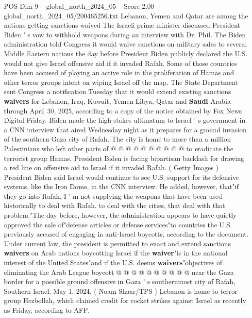 \begin{textsample}{POS Dim 9 – global\_north\_2024\_05 – Score 2.00 – global\_north\_2024\_05/200465256.txt}  \label{ex:f9_pos_207}
Lebanon, Yemen and Qatar are among the nations getting sanctions waived The Israeli prime minister discussed President Biden ' s vow to withhold weapons during an interview with Dr.
Phil.
The Biden administration told Congress it would waive sanctions on military sales to several Middle Eastern nations the day before President Biden publicly declared the U.S. would not give Israel offensive aid if it invaded Rafah.
Some of those countries have been accused of playing an active role in the proliferation of Hamas and other terror groups intent on wiping Israel off the map.
The State Department sent Congress a notification Tuesday that it would extend existing sanctions \textbf{waivers} for Lebanon, Iraq, Kuwait, Yemen Libya, Qatar and \textbf{Saudi} Arabia through April 30, 2025, according to a copy of the notice obtained by Fox News Digital Friday.
Biden made the high-stakes ultimatum to Israel ' s government in a CNN interview that aired Wednesday night as it prepares for a ground invasion of the southern Gaza city of Rafah.
The city is home to more than a million Palestinians who left other parts of @ @ @ @ @ @ @ @ @ @ to eradicate the terrorist group Hamas.
President Biden is facing bipartisan backlash for drawing a red line on offensive aid to Israel if it invaded Rafah. ( Getty Images ) President Biden said Israel would continue to see U.S. support for its defensive systems, like the Iron Dome, in the CNN interview.
He added, however, that"if they go into Rafah, I ' m not supplying the weapons that have been used historically to deal with Rafah, to deal with the cities, that deal with that problem."The day before, however, the administration appears to have quietly approved the sale of"defense articles or defense services"to countries the U.S. previously accused of engaging in anti-Israel boycotts, according to the document.
Under current law, the president is permitted to enact and extend sanctions \textbf{waivers} on Arab nations boycotting Israel if the \textbf{waiver}"is in the national interest of the United States"and if the U.S. deems \textbf{waivers}"objectives of eliminating the Arab League boycott @ @ @ @ @ @ @ @ @ @ near the Gaza border for a possible ground offensive in Gaza ' s southernmost city of Rafah, Southern Israel, May 1, 2024. ( Noam Shaar/TPS ) Lebanon is home to terror group Hezbollah, which claimed credit for rocket strikes against Israel as recently as Friday, according to AFP.

\end{textsample}
